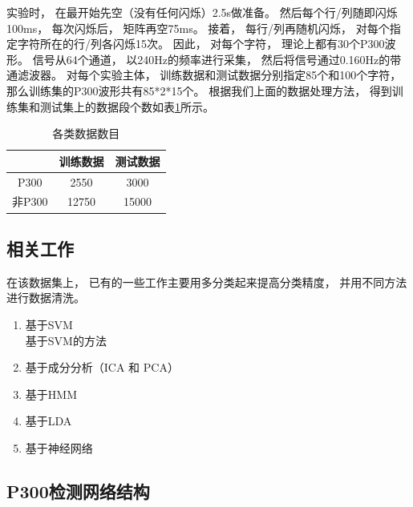 实验时， 在最开始先空（没有任何闪烁）2.5s做准备。 然后每个行/列随即闪烁100ms， 每次闪烁后， 矩阵再空75ms。 接着， 每行/列再随机闪烁， 对每个指定字符所在的行/列各闪烁15次。 因此， 对每个字符， 理论上都有30个P300波形。 信号从64个通道， 以240Hz的频率进行采集， 然后将信号通过0.160Hz的带通滤波器\cite{sharbrough1991american}。 对每个实验主体， 训练数据和测试数据分别指定85个和100个字符， 那么训练集的P300波形共有85*2*15个。 根据我们上面的数据处理方法， 得到训练集和测试集上的数据段个数如表\ref{tab:p300_experiment_conf}所示。 


\begin{table}[ht]
\centering
  \begin{tabular}{|c||c|c|}
  \hline
   & 训练数据 & 测试数据\\
  \hline\hline
   P300 & 2550 & 3000\\
  \hline
  非P300 & 12750 & 15000\\
  \hline
  \end{tabular}
  \caption{各类数据数目}
  \centering \label{tab:p300_experiment_conf}
\end{table}


\subsection{相关工作}
在该数据集上， 已有的一些工作主要用多分类起来提高分类精度， 并用不同方法进行数据清洗。
\begin{enumerate}
	\item 基于SVM\cite{rakotomamonjy2008bci,blankertz2002classifying}\\
	基于SVM的方法\cite{}
	\item 基于成分分析（ICA 和 PCA）\\
	\item 基于HMM\cite{solhjoo2005classification,chiappa2003hmm,zhong2002hmms}
	\item 基于LDA\\
	\item 基于神经网络\cite{felzer2003analyzing,anderson1995determining,cecotti2008time,masic1995neural,masic1993neural}\\
\end{enumerate}


\subsection{P300检测网络结构}

